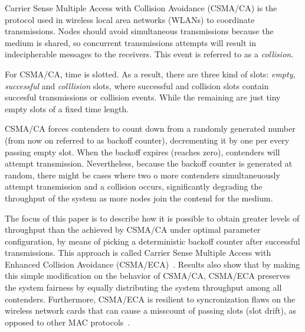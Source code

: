 Carrier Sense Multiple Access with Collision Avoidance (CSMA/CA) is the protocol used in wireless local area networks (WLANs) to coordinate transmissions. Nodes should avoid simultaneous transmissions because the medium is shared, so concurrent transmissions attempts will result in indecipherable messages to the receivers. This event is referred to as a \emph{collision}. 

For CSMA/CA, time is slotted. As a result, there are three kind of slots: \emph{empty}, \emph{successful} and \emph{colllision} slots, where successful and collision slots contain succesful transmissions or collision events. While the remaining are just tiny empty slots of a fixed time length.

CSMA/CA forces contenders to count down from a randomly generated number (from now on referred to as backoff counter), decrementing it by one per every passing empty slot. When the backoff expires (reaches zero), contenders will attempt transmission. Nevertheless, because the backoff counter is generated at random, there might be cases where two o more contenders simultaneuously attempt transmission and a collision occurs, significantly degrading the throughput of the system as more nodes join the contend for the medium.

The focus of this paper is to describe how it is possible to obtain greater levels of throughput than the achieved by CSMA/CA under optimal parameter configuration, by means of picking a deterministic backoff counter after successful transmissions. This approach is called Carrier Sense Multiple Access with Enhanced Collision Avoidance (CSMA/ECA)~\cite{CSMA_ECA}. Results also show that by making this simple modification on the behavior of CSMA/CA, CSMA/ECA preserves the system fairness by equally distributing the system throughput among all contenders. Furthermore, CSMA/ECA is resilient to syncronization flaws on the wireless network cards that can cause a misscount of passing slots (slot drift), as opposed to other MAC protocols~\cite{slotDrift}.
